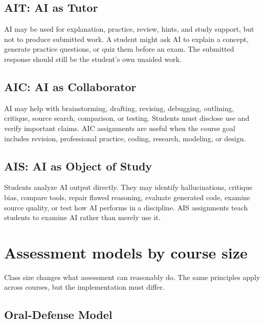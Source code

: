 \documentclass{SIAMbook2023}
\newcommand{\AIT}{\textcolor{catAIT}{\textbf{AIT}}}
\newcommand{\AIC}{\textcolor{catAIC}{\textbf{AIC}}}
\newcommand{\AIS}{\textcolor{catAIS}{\textbf{AIS}}}
\begin{document}
\subsection{\texorpdfstring{\AIT{}: AI as Tutor}{AIT: AI as Tutor}}
\label{u:subsec:yellow}

AI may be used for explanation, practice, review, hints, and study support, but not to produce submitted work. A student might ask AI to explain a concept, generate practice questions, or quiz them before an exam. The submitted response should still be the student's own unaided work.

\subsection{\texorpdfstring{\AIC{}: AI as Collaborator}{AIC: AI as Collaborator}}
\label{u:subsec:green}

AI may help with brainstorming, drafting, revising, debugging, outlining, critique, source search, comparison, or testing. Students must disclose use and verify important claims. AIC assignments are useful when the course goal includes revision, professional practice, coding, research, modeling, or design.

\subsection{\texorpdfstring{\AIS{}: AI as Object of Study}{AIS: AI as Object of Study}}
\label{u:subsec:blue}

Students analyze AI output directly. They may identify hallucinations, critique bias, compare tools, repair flawed reasoning, evaluate generated code, examine source quality, or test how AI performs in a discipline. AIS assignments teach students to examine AI rather than merely use it.

\section{Assessment models by course size}
\label{u:sec:models}%

Class size changes what assessment can reasonably do. The same principles apply across courses, but the implementation must differ.

\subsection{Oral-Defense Model}
\label{u:subsec:oral-defense}
\end{document}
